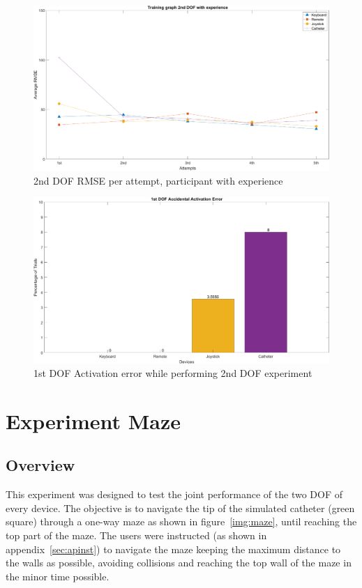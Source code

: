 \begin{figure}[ht]
   \centering
   \includegraphics[width=1.0\textwidth]{img/2nd/2ndTrainExp.png}
   \caption{2nd DOF RMSE per attempt, participant with experience}
   \label{img:2ndTrainExp}
\end{figure}

\begin{figure}[ht]
   \centering
   \includegraphics[width=1.0\textwidth]{img/2nd/2ndAct.png}
   \caption{1st DOF Activation error while performing 2nd DOF experiment}
   \label{img:2ndAct}
\end{figure}
\clearpage

\section{Experiment Maze}\label{sec:expmaze}
\subsection{Overview}\label{subsec:2ndover}
This experiment was designed to test the joint performance of the two DOF of every device. The objective is to navigate the tip of the simulated catheter (green square) through a one-way maze as shown in figure~\ref{img:maze}, until reaching the top part of the maze. The users were instructed (as shown in appendix~\ref{sec:apinst}) to navigate the maze keeping the maximum distance to the walls as possible, avoiding collisions and reaching the top wall of the maze in the minor time possible.\\

